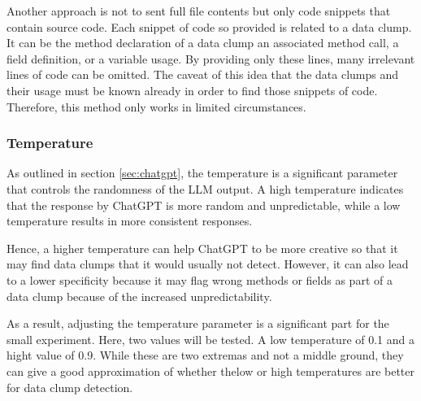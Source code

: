 Another approach is not to sent full file contents but only code snippets that contain source code. Each snippet of code so provided is related to a data clump. It can be the method declaration of a data clump an associated method call, a field definition, or a variable usage. By providing only these lines, many irrelevant lines of code can be omitted. The caveat of this idea that the data clumps  and their usage must be known already in order to find those snippets of code. Therefore, this method only works in limited circumstances.

\subsubsection{Temperature}
As outlined in section \ref{sec:chatgpt}, the temperature is a significant parameter that controls the randomness of the \ac{LLM} output. A high temperature indicates that the response by ChatGPT is more random and unpredictable, while a low temperature results in more consistent responses.

Hence, a higher temperature can help ChatGPT to be more creative so that it may find data clumps that it would usually not detect. However, it can also lead to a lower specificity because it may flag wrong methods or fields as part of a data clump because of the increased unpredictability. 

As a result, adjusting the temperature parameter is a significant part for the small experiment. Here, two values will be tested. A low temperature of 0.1 and a hight value of 0.9. While these are two extremas and not a middle ground, they can give a good approximation of whether thelow or high temperatures are better for data clump detection. 

